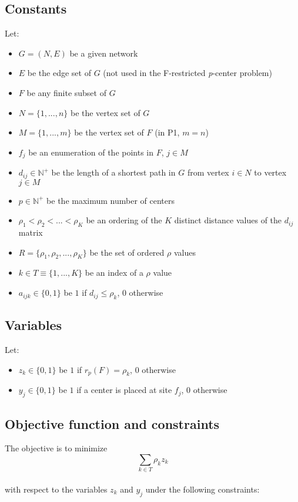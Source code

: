 \subsection{Constants}
Let:
\begin{itemize}
	\item $G = \left( N, E\right)$ be a given network
	\item $E$ be the edge set of $G$ (not used in the F-restricted \textit{p}-center problem)
	\item $F$ be any finite subset of $G$
	\item $N = \lbrace 1, ..., n\rbrace$ be the vertex set of $G$
	\item $M = \lbrace 1, ..., m\rbrace$ be the vertex set of $F$ (in P1, $m = n$)
	\item $f_j$ be an enumeration of the points in $F$, $j \in M$
	\item $d_{ij} \in \mathbb{N}^+$ be the length of a shortest path in $G$ from vertex $i \in N$ to vertex $j \in M$
	\item $p \in \mathbb{N}^+$ be the maximum number of centers
	\item $\rho_1 < \rho_2 < ... < \rho_K$ be an ordering of the $K$ distinct distance values of the $d_{ij}$ matrix
	\item $R = \lbrace \rho_1, \rho_2, ..., \rho_K \rbrace$ be the set of ordered $\rho$ values
	\item $k \in T \equiv \lbrace 1, ..., K\rbrace$ be an index of a $\rho$ value
	\item $a_{ijk} \in \lbrace 0, 1\rbrace$ be $1$ if $d_{ij} \leq \rho_k$, $0$ otherwise
\end{itemize}
\subsection{Variables}
Let:
\begin{itemize}
	\item $z_{k} \in \lbrace 0, 1\rbrace$ be $1$ if $r_p(F) = \rho_k$, $0$ otherwise
	\item $y_{j} \in \lbrace 0, 1\rbrace$ be $1$ if a center is placed at site $f_j$, $0$ otherwise
\end{itemize}
\subsection{Objective function and constraints}
The objective is to minimize\\ $$\sum\limits_{k \in T} \rho_k z_k$$\\ with respect to the variables $z_{k}$ and $y_{j}$ under the following constraints:\\


